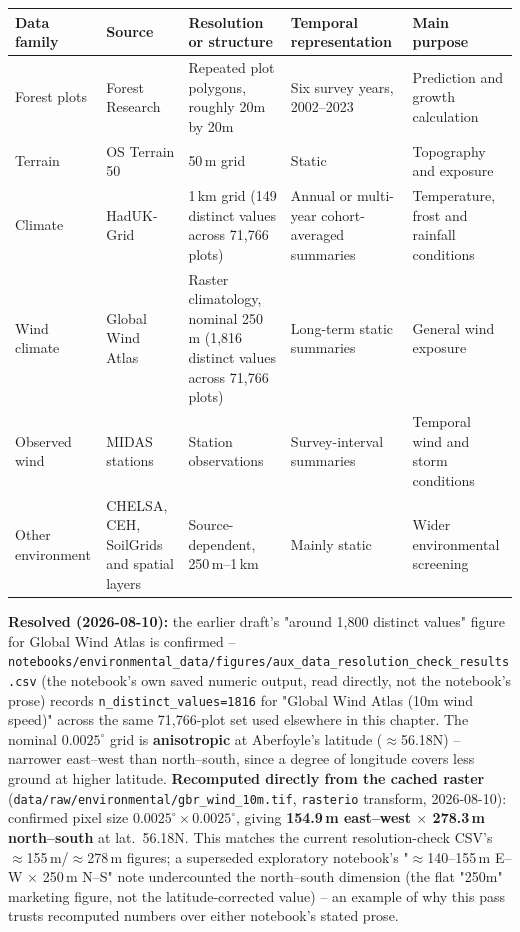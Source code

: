 \begin{table}[h]
\centering
\begin{tabular}{p{2.2cm}p{3cm}p{3cm}p{3cm}p{3.5cm}}
\hline
Data family & Source & Resolution or structure & Temporal representation & Main purpose \\
\hline
Forest plots & Forest Research & Repeated plot polygons, roughly 20m by 20m & Six survey years, 2002--2023 & Prediction and growth calculation \\
Terrain & OS Terrain 50 & 50\,m grid & Static & Topography and exposure \\
Climate & HadUK-Grid & 1\,km grid (149 distinct values across 71,766 plots) & Annual or multi-year cohort-averaged summaries & Temperature, frost and rainfall conditions \\
Wind climate & Global Wind Atlas & Raster climatology, nominal 250\,m (1,816 distinct values across 71,766 plots) & Long-term static summaries & General wind exposure \\
Observed wind & MIDAS stations & Station observations & Survey-interval summaries & Temporal wind and storm conditions \\
Other environment & CHELSA, CEH, SoilGrids and spatial layers & Source-dependent, 250\,m--1\,km & Mainly static & Wider environmental screening \\
\hline
\end{tabular}
\end{table}
\textbf{Resolved (2026-08-10):} the earlier draft's "around 1,800 distinct values" figure for Global Wind Atlas is confirmed -- \texttt{notebooks/environmental\_data/figures/aux\_data\_resolution\_check\_results.csv} (the notebook's own saved numeric output, read directly, not the notebook's prose) records \texttt{n\_distinct\_values=1816} for "Global Wind Atlas (10m wind speed)" across the same 71,766-plot set used elsewhere in this chapter. The nominal $0.0025^\circ$ grid is \textbf{anisotropic} at Aberfoyle's latitude ($\approx$56.18\textdegree N) -- narrower east--west than north--south, since a degree of longitude covers less ground at higher latitude. \textbf{Recomputed directly from the cached raster} (\texttt{data/raw/environmental/gbr\_wind\_10m.tif}, \texttt{rasterio} transform, 2026-08-10): confirmed pixel size $0.0025^\circ\times0.0025^\circ$, giving \textbf{154.9\,m east--west $\times$ 278.3\,m north--south} at lat.\ 56.18\textdegree N. This matches the current resolution-check CSV's $\approx$155\,m/$\approx$278\,m figures; a superseded exploratory notebook's "$\approx$140--155\,m E--W $\times$ 250\,m N--S" note undercounted the north--south dimension (the flat "250m" marketing figure, not the latitude-corrected value) -- an example of why this pass trusts recomputed numbers over either notebook's stated prose.

